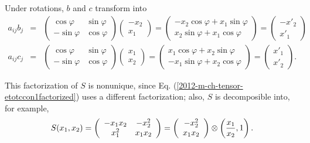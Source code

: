 {Under rotations, $b$ and $c$  transform into
\begin{eqnarray*}
a_{ij}b_j&=&
  \left(
    \begin{array}{cc}
      \cos \varphi  & \sin \varphi \\
      -\sin \varphi & \cos \varphi
    \end{array}
  \right)
  \left(
    \begin{array}{c}
      -x_2\\
       x_1
    \end{array}
  \right)
=
  \left(
    \begin{array}{c}
      -x_2\cos \varphi +x_1 \sin \varphi \\
      x_2\sin \varphi +x_1 \cos \varphi
    \end{array}
  \right)
=
  \left(
    \begin{array}{c}
      -x'_2 \\
      x'_1
    \end{array}
  \right)    \\
 a_{ij}c_j&=&
  \left(
    \begin{array}{cc}
      \cos \varphi  & \sin \varphi \\
      -\sin \varphi & \cos \varphi
    \end{array}
  \right)
  \left(
    \begin{array}{c}
      x_1\\
       x_2
    \end{array}
  \right)
=
  \left(
    \begin{array}{c}
      x_1\cos \varphi +x_2 \sin \varphi \\
      -x_1\sin \varphi +x_2 \cos \varphi
    \end{array}
  \right)
=
  \left(
    \begin{array}{c}
      x'_1    \\
      x'_2
    \end{array}
  \right) .
\end{eqnarray*}

This factorization of $S$ is nonunique, since
Eq.
(\ref{2012-m-ch-tensor-etotccon1factorized})
uses a different factorization; also, $S$ is decomposible into, for example,
$$S(x_1,x_2)=
  \left(
    \begin{array}{cc}
      -x_1x_2 & -x_2^2 \\
      x_1^2   & x_1x_2
    \end{array}
  \right)     =
  \left(
    \begin{array}{cc}
      -x_2^2 \\
      x_1 x_2
    \end{array}
  \right)
\otimes \left({x_1\over x_2},1\right).
$$



\eexample
}



